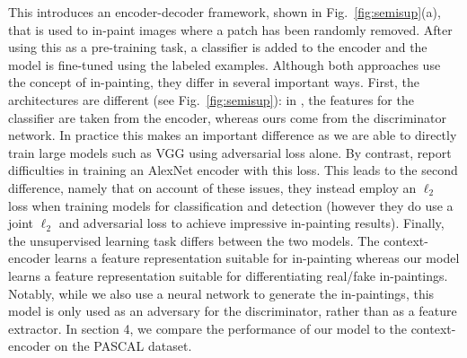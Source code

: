 \documentclass{article} %
\newcommand{\fig}[1]{Fig.~\ref{fig:#1}}
\begin{document}
This introduces an encoder-decoder framework, shown in
\fig{semisup}(a), that is used to in-paint images where a patch has
been randomly removed. After using this as a pre-training task, a
classifier is added to the encoder and the model is fine-tuned using
the labeled examples. Although both approaches use the concept of
in-painting, they differ in several important ways. First, the
architectures are different (see \fig{semisup}): in \cite{pathak2016},
the features for the classifier are taken from the encoder, whereas
ours come from the discriminator network. In practice this makes an
important difference as we are able to directly train large models
such as VGG \citep{vgg} using adversarial loss alone. By contrast,
\cite{pathak2016} report difficulties in training an
AlexNet encoder with this loss. This leads to the second difference,
namely that on account of these issues, they instead employ an
$\ell_2$ loss when training models for classification and detection
(however they do use a joint $\ell_2$ and adversarial loss to achieve
impressive in-painting results).  Finally, the unsupervised learning
task differs between the two models.  The context-encoder learns a
feature representation suitable for in-painting whereas our model
learns a feature representation suitable for differentiating real/fake
in-paintings.  Notably, while we also use a neural network to generate
the in-paintings, this model is only used as an adversary for the
discriminator, rather than as a feature extractor.  In section 4, we
compare the performance of our model to the context-encoder on the
PASCAL dataset.
\end{document}
